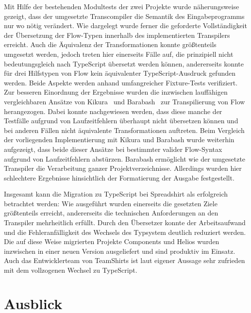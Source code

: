 Mit Hilfe der bestehenden Modultests der zwei Projekte wurde näherungsweise gezeigt, dass der umgesetzte Transcompiler die Semantik des Eingabeprogramms nur wo nötig verändert. Wie dargelegt wurde ferner die geforderte Vollständigkeit der Übersetzung der Flow-Typen innerhalb des implementierten Transpilers erreicht. Auch die Äquivalenz der Transformationen konnte größtenteils umgesetzt werden, jedoch treten hier einerseits Fälle auf, die prinzipiell nicht bedeutungsgleich nach TypeScript übersetzt werden können, andererseits konnte für drei Hilfstypen von Flow kein äquivalenter TypeScript-Ausdruck gefunden werden. Beide Aspekte werden anhand umfangreicher Fixture-Tests verifiziert. Zur besseren Einordnung der Ergebnisse wurden die inzwischen lauffähigen vergleichbaren Ansätze von Kikura~\autocite{KIKURA:FLOW_TO_TS} und Barabash~\autocite{BARABASH:FLOW_TO_TS} zur Transpilierung von Flow herangezogen. Dabei konnte nachgewiesen werden, dass diese manche der Testfälle aufgrund von Laufzeitfehlern überhaupt nicht übersetzen können und bei anderen Fällen nicht äquivalente Transformationen auftreten.
Beim Vergleich der vorliegenden Implementierung mit Kikura und Barabash wurde weiterhin aufgezeigt, dass beide dieser Ansätze bei bestimmter valider Flow-Syntax aufgrund von Laufzeitfehlern abstürzen. Barabash ermöglicht wie der umgesetzte Transpiler die Verarbeitung ganzer Projektverzeichnisse. Allerdings wurden hier schlechtere Ergebnisse hinsichtlich der Formatierung der Ausgabe festgestellt.

Insgesamt kann die Migration zu TypeScript bei Spreadshirt als erfolgreich betrachtet werden: Wie ausgeführt wurden einerseits die gesetzten Ziele größtenteils erreicht, andererseits die technischen Anforderungen an den Transpiler mehrheitlich erfüllt. Durch den Übersetzer konnte der Arbeitsaufwand und die Fehleranfälligkeit des Wechsels des Typsystem deutlich reduziert werden.
Die auf diese Weise migrierten Projekte Components und Helios wurden inzwischen in einer neuen Version ausgeliefert und sind produktiv im Einsatz. Auch das Entwicklerteam von TeamShirts ist laut eigener Aussage sehr zufrieden mit dem vollzogenen Wechsel zu TypeScript.

\section{Ausblick}

